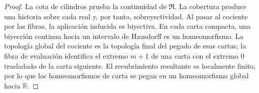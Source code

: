 \begin{proof}
La cota de cilindros prueba la continuidad de \(\mathfrak R\). La cobertura
produce una historia sobre cada real y, por tanto, sobreyectividad. Al pasar
al cociente por las fibras, la aplicación inducida es biyectiva. En cada
carta compacta, una biyección continua hacia un intervalo de Hausdorff es un
homeomorfismo. La topología global del cociente es la topología final del
pegado de esas cartas; la fibra de evaluación identifica el extremo
\(m+1\) de una carta con el extremo \(0\) trasladado de la carta siguiente.
El recubrimiento resultante es localmente finito, por lo que los
homeomorfismos de carta se pegan en un homeomorfismo global hacia
\(\mathbb R\).
\end{proof}
